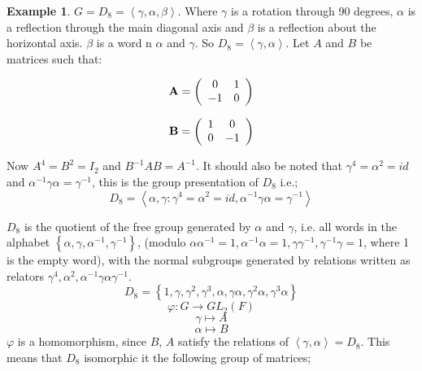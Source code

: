 \documentclass[12pt]{amsart}
\theoremstyle{definition}
\newtheorem{example}[theorem]{Example}
\begin{document}
\begin{example}
$G = D_{8} = \left\langle \gamma, \alpha, \beta \right\rangle$. Where $\gamma$ is a rotation through 90 degrees, $\alpha$ is a reflection through the main diagonal axis and $\beta$ is a reflection about the horizontal axis. $\beta$ is a word n $\alpha$ and $\gamma$. So $D_{8} = \left\langle \gamma, \alpha \right\rangle$. Let $A$ and $B$ be matrices such that:

\begin{equation*}
\mbox{\textbf{A}} = \left(
\begin{array}{cc}
     0 & 1 \\
    - 1 & 0 \\
\end{array}
\right)
\end{equation*}

\begin{equation*}
\mbox{\textbf{B}} = \left(
\begin{array}{cc}
     1 & 0 \\
     0 & - 1 \\
\end{array}
\right)
\end{equation*}

Now $A^{4} = B^{2} = I_{2}$ and $B^{- 1} A B = A^{- 1}$. It should also be noted that $\gamma^{4} = \alpha^{2} = id$ and $\alpha^{-1} \gamma \alpha = \gamma^{- 1}$, this is the group presentation of $D_{8}$ i.e.; $$ D_{8} = \left\langle \alpha, \gamma : \gamma^{4} = \alpha^{2} = id, \alpha^{-1} \gamma \alpha = \gamma^{-1} \right\rangle$$

$D_{8}$ is the quotient of the free group generated by $\alpha$ and $\gamma$, i.e. all words in the alphabet $\left\{ \alpha, \gamma, \alpha^{- 1}, \gamma^{- 1} \right\}$, (modulo $\alpha \alpha^{- 1} = 1, \alpha^{- 1} \alpha = 1, \gamma \gamma^{- 1}, \gamma^{- 1} \gamma = 1$, where 1 is the empty word), with the normal subgroups generated by relations written as relators $ \gamma^{4}, \alpha^{2}, \alpha^{- 1} \gamma \alpha \gamma^{- 1}$. 
$$D_{8} = \left\{ 1, \gamma, \gamma^{2}, \gamma^{3}, \alpha, \gamma \alpha, \gamma^{2} \alpha, \gamma^{3} \alpha \right\}$$
$$\varphi : G \rightarrow GL_{2} (F)$$
$$\gamma \mapsto A$$
$$\alpha \mapsto B$$
$\varphi$ is a homomorphism, since $B$, $A$ satisfy the relations of $\left\langle \gamma, \alpha \right\rangle = D_{8}$. This means that $D_{8}$ isomorphic it the following group of matrices;


\end{example}
\end{document}
